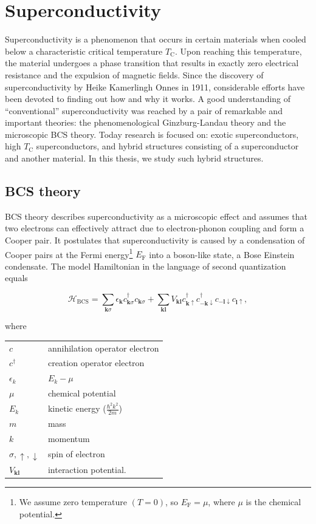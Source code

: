 \section{\label{sec:superconductivity}Superconductivity}

Superconductivity is a phenomenon that occurs in certain materials when cooled below a characteristic critical temperature $T_{\mathrm{C}}$.
Upon reaching this temperature, the material undergoes a phase transition that results in exactly zero electrical resistance and the expulsion of magnetic fields.
Since the discovery of superconductivity by Heike Kamerlingh Onnes in 1911, considerable efforts have been devoted to finding out how and why it works.
A good understanding of ``conventional'' superconductivity was reached by a pair of remarkable and important theories: the phenomenological Ginzburg-Landau theory and the microscopic BCS theory.
Today research is focused on: exotic superconductors, high $T_{\mathrm{C}}$ superconductors, and hybrid structures consisting of a superconductor and another material.
In this thesis, we study such hybrid structures.

\subsection{BCS theory\label{sec:BCS-theory}}

BCS theory describes superconductivity as a microscopic effect and assumes that two electrons can effectively attract due to electron-phonon coupling and form a Cooper pair.
It postulates that superconductivity is caused by a condensation of Cooper pairs at the Fermi energy\footnote{We assume zero temperature $\left(T=0\right)$, so $E_{\textrm{F}}=\mu$, where $\mu$ is the chemical potential.} $E_{\textrm{F}}$ into a boson-like state, a Bose Einstein condensate.
The model Hamiltonian in the language of second quantization equals~\cite{Gennes1999}

\begin{equation}
\mathcal{H}_{\textrm{BCS}}=\sum_{\bm{k}\sigma}\epsilon_{\bm{k}}c_{\bm{k}\sigma}^{\dagger}c_{\bm{k}\sigma}+\sum_{\bm{k}\bm{l}}V_{\bm{k}\bm{l}}c_{\bm{k}\uparrow}^{\dagger}c_{-\bm{k}\downarrow}^{\dagger}c_{-\bm{l}\downarrow}c_{\bm{l}\uparrow},\label{eq:BCS}
\end{equation}

where

\begin{tabular}{ll}
 $c$  & annihilation operator electron \tabularnewline
 $c^{\dagger}$ & creation operator electron\tabularnewline
 $\epsilon_{k}$  &  $E_{k}-\mu$\tabularnewline
$\mu$ & chemical potential\tabularnewline
$E_{k}$ & kinetic energy ($\frac{\hbar^{2}k^{2}}{2m}$)\tabularnewline
$m$ & mass\tabularnewline
 $k$  & momentum\tabularnewline
 $\sigma,\uparrow,\downarrow$  & spin of electron\tabularnewline
 $V_{\bm{kl}}$ & interaction potential.\tabularnewline
\end{tabular}


